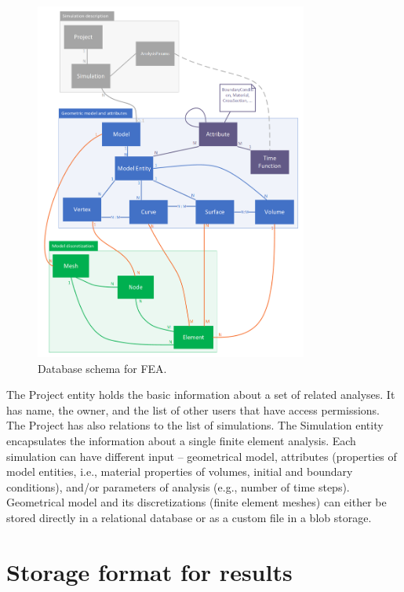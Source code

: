 \begin{figure}[H]
    \centering
    \includegraphics[width=0.8\textwidth]{figures/chapter-data-management/FEA-database-schema}
    \decoRule
    \caption{Database schema for FEA.}
    \label{fig:FEA-db-schema}
\end{figure}

The Project entity holds the basic information about a set of related analyses. It has name, the owner, and the list of other users that have access permissions. The Project has also relations to the list of simulations. The Simulation entity encapsulates the information about a single finite element analysis. Each simulation can have different input -- geometrical model, attributes (properties of model entities, i.e., material properties of volumes, initial and boundary conditions), and/or parameters of analysis (e.g., number of time steps). Geometrical model and its discretizations (finite element meshes) can either be stored directly in a relational database or as a custom file in a blob storage.


\section{Storage format for results}
\label{sec:storage-format}

